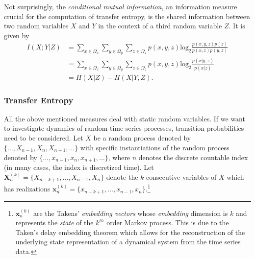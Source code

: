 \documentclass[12pt]{article}
\begin{document}
Not surprisingly, the \textit{conditional mutual information}, an information measure crucial for the computation of transfer entropy, is the shared information between two random variables $X$ and $Y$ in the context of a third random variable $Z$. It is given by
\begin{align*}
I(X;Y | Z) &= \sum_{x \in \Omega_x}^{}\sum_{y \in \Omega_y}^{}\sum_{z \in \Omega_z}^{}p(x,y,z)\text{log}_2\frac{p(x,y,z)p(z)}{p(x,z)p(y,z)} \\
&= \sum_{x \in \Omega_x}^{}\sum_{y \in \Omega_y}^{}\sum_{z \in \Omega_z}^{}p(x,y,z)\text{log}_2\frac{p(x|y,z)}{p(x|z)}\\
&= H(X|Z) - H(X|Y,Z).
\end{align*}
\subsubsection{Transfer Entropy}
All the above mentioned measures deal with static random variables. If we want to investigate dynamics of random time-series processes, transition probabilities need to be considered. Let $X$ be a random process denoted by $\{\dots, X_{n-1}, X_n, X_{n+1}, \dots\}$ with specific instantiations of the random process denoted by $\{\dots, x_{n-1}, x_n, x_{n+1}, \dots\}$, where $n$ denotes the discrete countable index (in many cases, the index is discretized time). Let $\boldsymbol{X}_n^{(k)} = \{X_{n-k+1},\dots,X_{n-1}, X_n\}$ denote the $k$ consecutive variables of $X$ which has realizations $\boldsymbol{x}_n^{(k)} = \{x_{n-k+1},\dots,x_{n-1}, x_n\}$.\footnote{$\boldsymbol{x}_n^{(k)}$ are the Takens' \textit{embedding vectors} whose \textit{embedding} dimension is $k$ and represents the \textit{state} of the $k^{th}$ order Markov process. This is due to the Taken's delay embedding theorem which allows for the reconstruction of the underlying state representation of a dynamical system from the time series data.}
\end{document}
